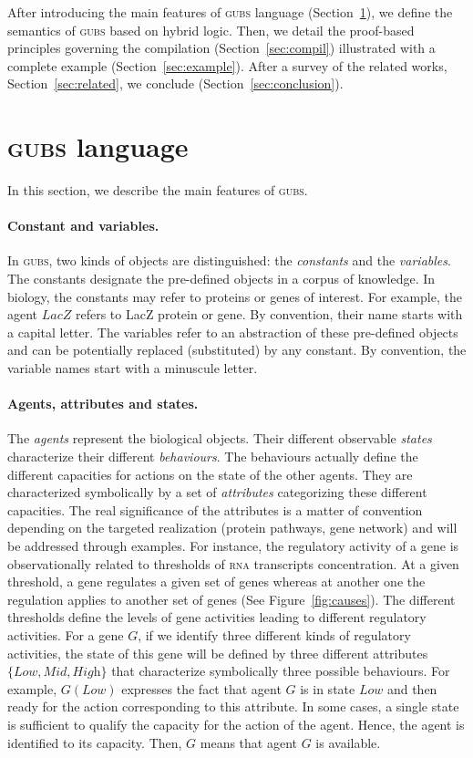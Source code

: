 \documentclass{eptcs}
\newcommand{\eg}[0]{\abbrev{\textit{e.g.}}}
\newcounter{ti}
\begin{document}
After introducing the main features of \textsc{gubs} language (Section~\ref{sec:gubs}), we define the semantics of \textsc{gubs} based on hybrid logic. Then, we detail the proof-based principles governing the compilation (Section~\ref{sec:compil}) illustrated with a complete example (Section~\ref{sec:example}). After a survey of the related works, Section~\ref{sec:related}, we conclude (Section~\ref{sec:conclusion}). 


\section{\textsc{gubs} language}
\label{sec:gubs}
\newcommand{\context}[1]{[#1]}

In this section, we describe the main features of \textsc{gubs}. 
\paragraph{Constant and variables.} In \textsc{gubs}, two kinds of objects are distinguished: the \emph{constants} and the \emph{variables}. The constants designate the pre-defined objects in a corpus of knowledge. In biology, the constants may refer to proteins or genes of interest. For example, the agent $\textit{LacZ}$ refers to LacZ protein or gene. By convention, their name starts with a capital letter. The variables refer to an abstraction of these pre-defined objects and can be potentially replaced (substituted) by any constant. By convention, the variable names start with a minuscule letter.
\paragraph{Agents, attributes and states.}
The \emph{agents} represent the biological objects. Their different observable \emph{states} characterize their different \emph{behaviours}. The behaviours actually define the different capacities for actions on the state of the other agents. They are characterized symbolically by a set of \emph{attributes} categorizing these different capacities. The real significance of the attributes is a matter of convention depending on the targeted realization (\eg protein pathways, gene network) and will be addressed through examples. 
For instance, the regulatory activity of a gene is observationally related to thresholds of \textsc{rna} transcripts concentration. At a given threshold, a gene regulates a given set of genes whereas at another one the regulation applies to another set of genes (See Figure~\ref{fig:causes}). The different thresholds define the levels of gene activities leading to different regulatory activities.
For a gene $G$, if we identify three different kinds of regulatory activities, the state of this gene will be defined by three different attributes $\{\textit{Low}, \textit{Mid}, \textit{High} \}$ that characterize symbolically three possible behaviours. 
For example, $G(\textit{Low})$ expresses the fact that agent $G$ is in state $\textit{Low}$ and then ready for the action corresponding to this attribute. In some cases, a single state is sufficient to qualify the capacity for the action of the agent. Hence, the agent is identified to its capacity. Then, $G$ means that agent $G$ is available. 
\end{document}
